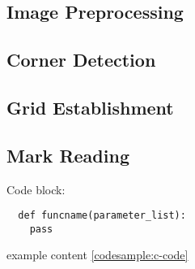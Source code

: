 \documentclass[12pt, letterpaper]{report}
\begin{document}
\subsection{Image Preprocessing}
\subsection{Corner Detection}
\subsection{Grid Establishment}
\subsection{Mark Reading}


Code block:

\begin{ex}
\label{codesample:c-code}
\begin{verbatim}
  def funcname(parameter_list):
    pass
\end{verbatim}
\end{ex}

example content \ref{codesample:c-code}
\end{document}

